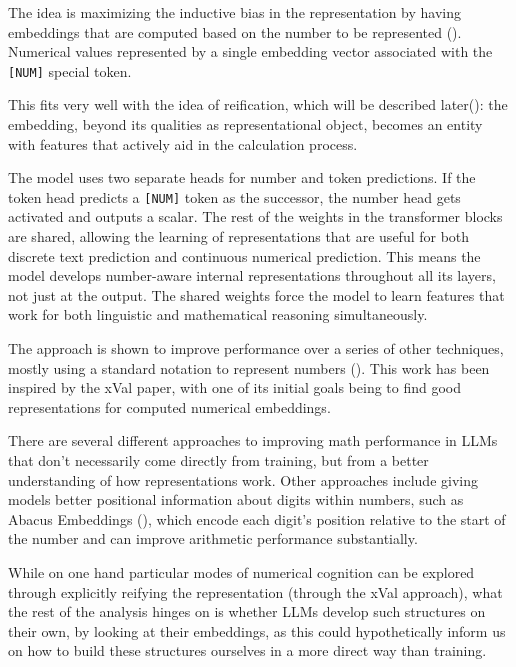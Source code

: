 \documentclass[
  a4paper, twoside, 10pt, titlepage]{book}
\begin{document}
The idea is maximizing the inductive bias in the representation by
having embeddings that are computed based on the number to be
represented (). Numerical
values represented by a single embedding vector associated with the
\texttt{{[}NUM{]}} special token.

This fits very well with the idea of reification, which will be
described later(): the embedding,
beyond its qualities as representational object, becomes an entity with
features that actively aid in the calculation process.

The model uses two separate heads for number and token predictions. If
the token head predicts a \texttt{{[}NUM{]}} token as the successor, the
number head gets activated and outputs a scalar. The rest of the weights
in the transformer blocks are shared, allowing the learning of
representations that are useful for both discrete text prediction and
continuous numerical prediction. This means the model develops
number-aware internal representations throughout all its layers, not
just at the output. The shared weights force the model to learn features
that work for both linguistic and mathematical reasoning simultaneously.

The approach is shown to improve performance over a series of other
techniques, mostly using a standard notation to represent numbers
(). This work has been
inspired by the xVal paper, with one of its initial goals being to find
good representations for computed numerical embeddings.

There are several different approaches to improving math performance in
LLMs that don't necessarily come directly from training, but from a
better understanding of how representations work. Other approaches
include giving models better positional information about digits within
numbers, such as Abacus Embeddings (), which encode each digit's position relative to the start
of the number and can improve arithmetic performance substantially.

While on one hand particular modes of numerical cognition can be
explored through explicitly reifying the representation (through the
xVal approach), what the rest of the analysis hinges on is whether LLMs
develop such structures on their own, by looking at their embeddings, as
this could hypothetically inform us on how to build these structures
ourselves in a more direct way than training.
\end{document}
